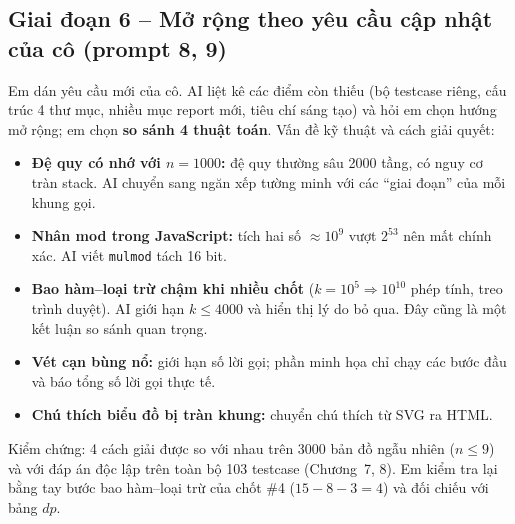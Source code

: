 \documentclass[12pt,a4paper]{report}
\begin{document}
\subsection*{Giai đoạn 6 -- Mở rộng theo yêu cầu cập nhật của cô (prompt 8, 9)}
Em dán yêu cầu mới của cô. AI liệt kê các điểm còn thiếu (bộ testcase riêng, cấu trúc 4 thư mục, nhiều mục report mới, tiêu chí sáng tạo) và hỏi em chọn hướng mở rộng; em chọn \textbf{so sánh 4 thuật toán}. Vấn đề kỹ thuật và cách giải quyết:
\begin{itemize}
  \item \textbf{Đệ quy có nhớ với $n=1000$:} đệ quy thường sâu 2000 tầng, có nguy cơ tràn stack. AI chuyển sang ngăn xếp tường minh với các ``giai đoạn'' của mỗi khung gọi.
  \item \textbf{Nhân mod trong JavaScript:} tích hai số $\approx10^9$ vượt $2^{53}$ nên mất chính xác. AI viết \texttt{mulmod} tách 16 bit.
  \item \textbf{Bao hàm--loại trừ chậm khi nhiều chốt} ($k=10^5\Rightarrow10^{10}$ phép tính, treo trình duyệt). AI giới hạn $k\le4000$ và hiển thị lý do bỏ qua. Đây cũng là một kết luận so sánh quan trọng.
  \item \textbf{Vét cạn bùng nổ:} giới hạn số lời gọi; phần minh họa chỉ chạy các bước đầu và báo tổng số lời gọi thực tế.
  \item \textbf{Chú thích biểu đồ bị tràn khung:} chuyển chú thích từ SVG ra HTML.
\end{itemize}
Kiểm chứng: 4 cách giải được so với nhau trên 3000 bản đồ ngẫu nhiên ($n\le 9$) và với đáp án độc lập trên toàn bộ 103 testcase (Chương~7, 8). Em kiểm tra lại bằng tay bước bao hàm--loại trừ của chốt \#4 ($15-8-3=4$) và đối chiếu với bảng $dp$.
\end{document}

